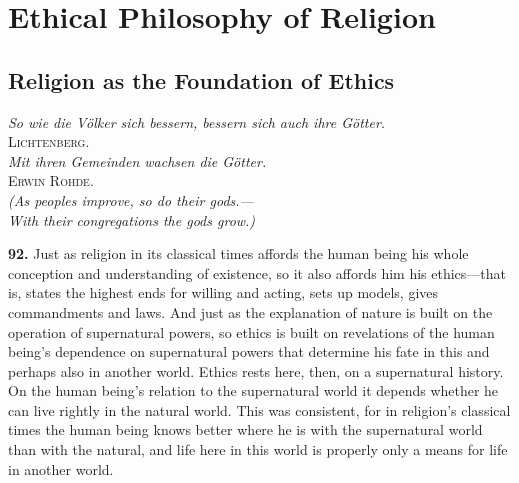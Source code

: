 \documentclass[12pt,a4paper]{book}
\newcommand{\opage}[1]{\marginnote{\footnotesize\textit{[#1]}}}
\begin{document}
\chapter[Ethical Philosophy of Religion]{Ethical Philosophy of Religion\opage{209}}
\label{ch:ethics}

\section{Religion as the Foundation of Ethics}
\label{sec:foundation-ethics}

\begin{flushright}
\opage{211}
\textit{So wie die Völker sich bessern, bessern sich auch ihre Götter.}\\[2pt]
\textsc{Lichtenberg}.\\[6pt]
\textit{Mit ihren Gemeinden wachsen die Götter.}\\[2pt]
\textsc{Erwin Rohde}.\\[4pt]
\textit{(As peoples improve, so do their gods.---}\\
\textit{With their congregations the gods grow.)}
\end{flushright}

\bigskip

\noindent\textbf{92.} Just as religion in its classical times affords the human being his whole
conception and understanding of existence, so it also affords him his ethics---that is, states the
highest ends for willing and acting, sets up models, gives commandments and laws. And just as the
explanation of nature is built on the operation of supernatural powers, so ethics is built on
revelations of the human being's dependence on supernatural powers that determine his fate in this
and perhaps also in another world. Ethics rests here, then, on a supernatural history. On the human
being's relation to the supernatural world it depends whether he can live rightly in the natural
world. This was consistent, for in religion's classical times the human being knows better where he
is with the supernatural world than with the natural, and life here in this world is properly only
a means for life in another world.
\end{document}
